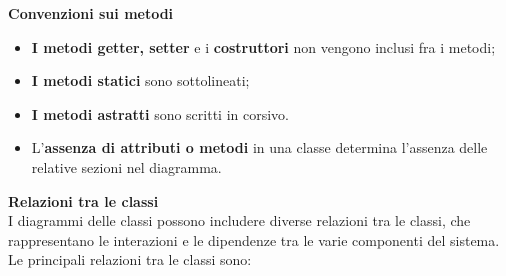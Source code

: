 \textbf{Convenzioni sui metodi}
\begin{itemize}
	\item \textbf{I metodi getter, setter} e i \textbf{costruttori} non vengono inclusi fra i metodi;
	\item \textbf{I metodi statici} sono sottolineati;
	\item \textbf{I metodi astratti} sono scritti in corsivo.
	\item L'\textbf{assenza di attributi o metodi} in una classe determina l'assenza delle relative sezioni nel diagramma.
\end{itemize}
\textbf{Relazioni tra le classi}\\
I diagrammi delle classi possono includere diverse relazioni tra le classi, che rappresentano le interazioni e le dipendenze tra le varie componenti del sistema. Le principali relazioni tra le classi sono:
